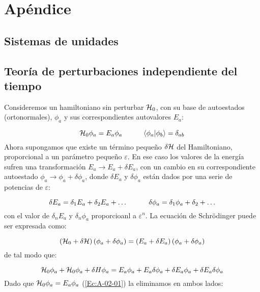 \appendix 
\chapter{Apéndice} \label{Ch:Anex_A}

\section{Sistemas de unidades}

\section{Teoría de perturbaciones independiente del tiempo}

Consideremos un hamiltoniano sin perturbar $\mathcal{H}_0$, con su base de autoestados (ortonormales), $\phi_a$ y sus correspondientes autovalores $E_a$:

\begin{equation}
    \mathcal{H}_0 \phi_a = E_a \phi_a \quad \quad \quad \langle \phi_a | \phi_b \rangle = \delta_{ab}
    \label{Ec:A-02-01}
\end{equation}
Ahora supongamos que existe un término pequeño $\delta \mathcal{H}$ del Hamiltoniano, proporcional a un parámetro pequeño $\varepsilon$. En ese caso los valores de la energía sufren una transformación $E_a \rightarrow E_a + \delta E_a$, con un cambio en su correspondiente autoestado $\phi_a \rightarrow \phi_a + \delta \phi_a$, donde $\delta E_a$ y $\delta \phi_a$ están dados por una serie de potencias de $\varepsilon$:

\begin{equation}
    \delta E_a = \delta_1 E_a + \delta_2 E_a + \ldots \quad \quad \quad \delta \phi_a = \delta_1 \phi_a + \delta_2 + \ldots 
\end{equation}
con el valor de $\delta_n E_a$ y $\delta_n \phi_a$ proporcioanl a $ \varepsilon^n$. La ecuación de Schrödinger puede ser expresada como:

\begin{equation}
    \left( \mathcal{H}_0 + \delta \mathcal{H} \right) \left( \phi_a + \delta \phi_a \right) = \left( E_a + \delta E_a \right) \left( \phi_a + \delta \phi_a \right)
\end{equation}
de tal modo que:

\begin{equation}
    \mathcal{H}_0  \phi_a + \mathcal{H}_0 \phi_a + \delta H \phi_a = E_a \phi_a + E_a \delta \phi_a + \delta E_a \phi_a + \delta E_a \delta \phi_a
\end{equation}
Dado que $\mathcal{H}_0 \phi_a = E_a \phi_a$ (\ref{Ec:A-02-01}) la eliminamos en ambos lados:
 
